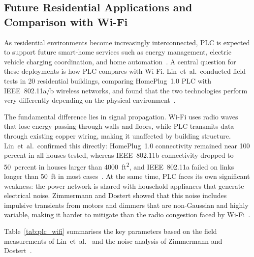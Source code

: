\subsection{Future Residential Applications and Comparison 
with Wi-Fi}

As residential environments become increasingly 
interconnected, PLC is expected to support future 
smart-home services such as energy management, electric 
vehicle charging coordination, and home 
automation~\cite{Galli2011GridSmartGridApplications}. A 
central question for these deployments is how PLC compares 
with Wi-Fi. Lin~et~al.\ conducted field tests in 20 
residential buildings, comparing HomePlug~1.0 PLC with 
IEEE~802.11a/b wireless networks, and found that the two 
technologies perform very differently depending on the 
physical environment~\cite{Lin2003WirelessPLCComparison}.

The fundamental difference lies in signal propagation. 
Wi-Fi uses radio waves that lose energy passing through 
walls and floors, while PLC transmits data through existing 
copper wiring, making it unaffected by building structure. 
Lin~et~al.\ confirmed this directly: HomePlug~1.0 
connectivity remained near 100 percent in all houses 
tested, whereas IEEE~802.11b connectivity dropped to 
50~percent in houses larger than 4000~ft\textsuperscript{2}, 
and IEEE~802.11a failed on links longer than 50~ft in most 
cases~\cite{Lin2003WirelessPLCComparison}. At the same 
time, PLC faces its own significant weakness: the power 
network is shared with household appliances that generate 
electrical noise. Zimmermann and Dostert showed that this 
noise includes impulsive transients from motors and dimmers 
that are non-Gaussian and highly variable, making it harder 
to mitigate than the radio congestion faced by 
Wi-Fi~\cite{Zimmermann2002PLCChannelModel}.

Table~\ref{tab:plc_wifi} summarises the key parameters 
based on the field measurements of Lin~et~al.\ 
\cite{Lin2003WirelessPLCComparison} and the noise analysis 
of Zimmermann and Dostert~\cite{Zimmermann2002PLCChannelModel}.

